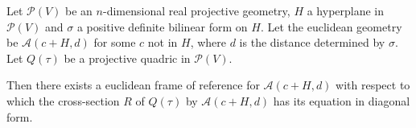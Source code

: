 Let $\mathcal{P}(V)$ be an $n$-dimensional real projective geometry, $H$ a hyperplane in $\mathcal{P}(V)$ and $\sigma$ a positive definite bilinear form on $H$. Let the euclidean geometry be $\mathcal{A}(c + H, d)$ for some $c$ not in $H$, where $d$ is the distance determined by $\sigma$. Let $Q(\tau)$ be a projective quadric in $\mathcal{P}(V)$.

Then there exists a euclidean frame of reference for $\mathcal{A}(c + H, d)$ with respect to which the cross-section $R$ of $Q(\tau)$ by $\mathcal{A}(c + H, d)$ has its equation in diagonal form.
